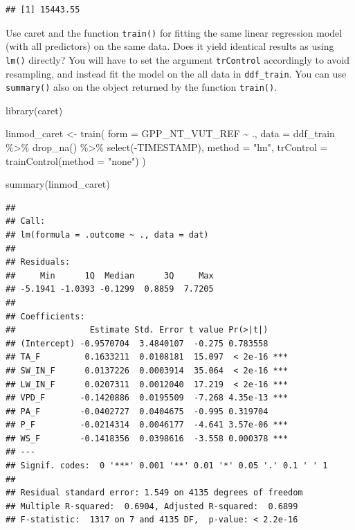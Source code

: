 \documentclass[
]{book}
\newenvironment{Shaded}{\begin{snugshade}}{\end{snugshade}}
\newcommand{\AttributeTok}[1]{\textcolor[rgb]{0.77,0.63,0.00}{#1}}
\newcommand{\FunctionTok}[1]{\textcolor[rgb]{0.00,0.00,0.00}{#1}}
\newcommand{\NormalTok}[1]{#1}
\newcommand{\OtherTok}[1]{\textcolor[rgb]{0.56,0.35,0.01}{#1}}
\newcommand{\SpecialCharTok}[1]{\textcolor[rgb]{0.00,0.00,0.00}{#1}}
\newcommand{\StringTok}[1]{\textcolor[rgb]{0.31,0.60,0.02}{#1}}
\begin{document}
\begin{verbatim}
## [1] 15443.55
\end{verbatim}

Use caret and the function \texttt{train()} for fitting the same linear regression model (with all predictors) on the same data. Does it yield identical results as using \texttt{lm()} directly? You will have to set the argument \texttt{trControl} accordingly to avoid resampling, and instead fit the model on the all data in \texttt{ddf\_train}. You can use \texttt{summary()} also on the object returned by the function \texttt{train()}.

\begin{Shaded}
\begin{Highlighting}[]
\FunctionTok{library}\NormalTok{(caret)}

\NormalTok{linmod\_caret }\OtherTok{\textless{}{-}} \FunctionTok{train}\NormalTok{(}
  \AttributeTok{form =}\NormalTok{ GPP\_NT\_VUT\_REF }\SpecialCharTok{\textasciitilde{}}\NormalTok{ ., }
  \AttributeTok{data =}\NormalTok{ ddf\_train }\SpecialCharTok{\%\textgreater{}\%} 
    \FunctionTok{drop\_na}\NormalTok{() }\SpecialCharTok{\%\textgreater{}\%} 
    \FunctionTok{select}\NormalTok{(}\SpecialCharTok{{-}}\NormalTok{TIMESTAMP), }
  \AttributeTok{method =} \StringTok{"lm"}\NormalTok{,}
  \AttributeTok{trControl =} \FunctionTok{trainControl}\NormalTok{(}\AttributeTok{method =} \StringTok{"none"}\NormalTok{)}
\NormalTok{)}

\FunctionTok{summary}\NormalTok{(linmod\_caret)}
\end{Highlighting}
\end{Shaded}

\begin{verbatim}
## 
## Call:
## lm(formula = .outcome ~ ., data = dat)
## 
## Residuals:
##     Min      1Q  Median      3Q     Max 
## -5.1941 -1.0393 -0.1299  0.8859  7.7205 
## 
## Coefficients:
##               Estimate Std. Error t value Pr(>|t|)    
## (Intercept) -0.9570704  3.4840107  -0.275 0.783558    
## TA_F         0.1633211  0.0108181  15.097  < 2e-16 ***
## SW_IN_F      0.0137226  0.0003914  35.064  < 2e-16 ***
## LW_IN_F      0.0207311  0.0012040  17.219  < 2e-16 ***
## VPD_F       -0.1420886  0.0195509  -7.268 4.35e-13 ***
## PA_F        -0.0402727  0.0404675  -0.995 0.319704    
## P_F         -0.0214314  0.0046177  -4.641 3.57e-06 ***
## WS_F        -0.1418356  0.0398616  -3.558 0.000378 ***
## ---
## Signif. codes:  0 '***' 0.001 '**' 0.01 '*' 0.05 '.' 0.1 ' ' 1
## 
## Residual standard error: 1.549 on 4135 degrees of freedom
## Multiple R-squared:  0.6904, Adjusted R-squared:  0.6899 
## F-statistic:  1317 on 7 and 4135 DF,  p-value: < 2.2e-16
\end{verbatim}
\end{document}
